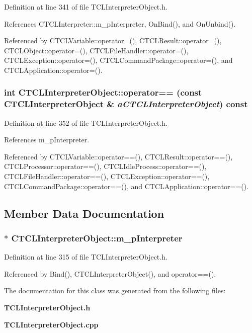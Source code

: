 Definition at line 341 of file TCLInterpreter\-Object.h.

References CTCLInterpreter::m\_\-p\-Interpreter, On\-Bind(), and On\-Unbind().

Referenced by CTCLVariable::operator=(), CTCLResult::operator=(), CTCLObject::operator=(), CTCLFile\-Handler::operator=(), CTCLException::operator=(), CTCLCommand\-Package::operator=(), and CTCLApplication::operator=().
\subsubsection{\setlength{\rightskip}{0pt plus 5cm}int CTCLInterpreter\-Object::operator== (const CTCLInterpreter\-Object \& {\em a\-CTCLInterpreter\-Object}) const\hspace{0.3cm}{\tt  [inline]}}\label{classCTCLInterpreterObject_a5}




Definition at line 352 of file TCLInterpreter\-Object.h.

References m\_\-p\-Interpreter.

Referenced by CTCLVariable::operator==(), CTCLResult::operator==(), CTCLProcessor::operator==(), CTCLIdle\-Process::operator==(), CTCLFile\-Handler::operator==(), CTCLException::operator==(), CTCLCommand\-Package::operator==(), and CTCLApplication::operator==().

\subsection{Member Data Documentation}
\subsubsection{$\ast$ CTCLInterpreter\-Object::m\_\-p\-Interpreter\hspace{0.3cm}{\tt  [private]}}\label{classCTCLInterpreterObject_o0}




Definition at line 315 of file TCLInterpreter\-Object.h.

Referenced by Bind(), CTCLInterpreter\-Object(), and operator==().

The documentation for this class was generated from the following files:\begin{CompactItemize}
\item 
{\bf TCLInterpreter\-Object.h}\item 
{\bf TCLInterpreter\-Object.cpp}\end{CompactItemize}

